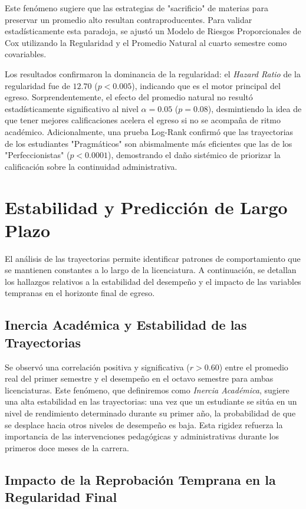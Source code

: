 Este fenómeno sugiere que las estrategias de "sacrificio" de materias para preservar un promedio alto resultan contraproducentes. Para validar estadísticamente esta paradoja, se ajustó un Modelo de Riesgos Proporcionales de Cox utilizando la Regularidad y el Promedio Natural al cuarto semestre como covariables. 

Los resultados confirmaron la dominancia de la regularidad: el \textit{Hazard Ratio} de la regularidad fue de $12.70$ ($p < 0.005$), indicando que es el motor principal del egreso. Sorprendentemente, el efecto del promedio natural no resultó estadísticamente significativo al nivel $\alpha = 0.05$ ($p = 0.08$), desmintiendo la idea de que tener mejores calificaciones acelera el egreso si no se acompaña de ritmo académico. Adicionalmente, una prueba Log-Rank confirmó que las trayectorias de los estudiantes "Pragmáticos" son abismalmente más eficientes que las de los "Perfeccionistas" ($p < 0.0001$), demostrando el daño sistémico de priorizar la calificación sobre la continuidad administrativa.

\section{Estabilidad y Predicción de Largo Plazo}

El análisis de las trayectorias permite identificar patrones de comportamiento que se mantienen constantes a lo largo de la licenciatura. A continuación, se detallan los hallazgos relativos a la estabilidad del desempeño y el impacto de las variables tempranas en el horizonte final de egreso.

\subsection{Inercia Académica y Estabilidad de las Trayectorias}

Se observó una correlación positiva y significativa ($r > 0.60$) entre el promedio real del primer semestre y el desempeño en el octavo semestre para ambas licenciaturas. Este fenómeno, que definiremos como \textit{Inercia Académica}, sugiere una alta estabilidad en las trayectorias: una vez que un estudiante se sitúa en un nivel de rendimiento determinado durante su primer año, la probabilidad de que se desplace hacia otros niveles de desempeño es baja. Esta rigidez refuerza la importancia de las intervenciones pedagógicas y administrativas durante los primeros doce meses de la carrera.

\subsection{Impacto de la Reprobación Temprana en la Regularidad Final}

